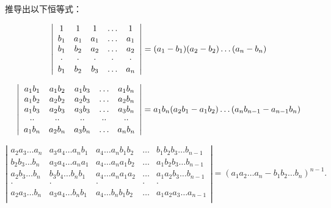推导出以下恒等式：

\[
\left| \begin{array}{c c c c c} 1 & 1 & 1 & \dots & 1 \\ b _ {1} & a _ {1} & a _ {1} & \dots & a _ {1} \\ b _ {1} & b _ {2} & a _ {2} & \dots & a _ {2} \\ \cdot & \cdot & \cdot & \cdot & \cdot \\ b _ {1} & b _ {2} & b _ {3} & \dots & a _ {n} \end{array} \right| = (a _ {1} - b _ {1}) (a _ {2} - b _ {2}) \dots (a _ {n} - b _ {n})
\]

\[
\left| \begin{array}{c c c c c} a _ {1} b _ {1} & a _ {1} b _ {2} & a _ {1} b _ {3} & \ldots & a _ {1} b _ {n} \\ a _ {1} b _ {2} & a _ {2} b _ {2} & a _ {2} b _ {3} & \ldots & a _ {2} b _ {n} \\ a _ {1} b _ {3} & a _ {2} b _ {3} & a _ {3} b _ {3} & \ldots & a _ {3} b _ {n} \\ \cdot \cdot & \cdot \cdot & \cdot \cdot & \cdot \cdot & \cdot \cdot \\ a _ {1} b _ {n} & a _ {2} b _ {n} & a _ {3} b _ {n} & \ldots & a _ {n} b _ {n} \end{array} \right| = a _ {1} b _ {n} (a _ {2} b _ {1} - a _ {1} b _ {2}) \ldots (a _ {n} b _ {n - 1} - a _ {n - 1} b _ {n})
\]

\[
\left| \begin{array}{cccccc} a _ {2} a _ {3} \ldots a _ {n} & a _ {3} a _ {4} \ldots a _ {n} b _ {1} & a _ {4} \ldots a _ {n} b _ {1} b _ {2} & \ldots & b _ {1} b _ {2} b _ {3} \ldots b _ {n - 1} \\ b _ {2} b _ {3} \ldots b _ {n} & a _ {3} a _ {4} \ldots a _ {n} a _ {1} & a _ {4} \ldots a _ {n} a _ {1} b _ {2} & \ldots & a _ {1} b _ {2} b _ {3} \ldots b _ {n - 1} \\ a _ {2} b _ {3} \ldots b _ {n} & b _ {3} b _ {4} \ldots b _ {n} b _ {1} & a _ {4} \ldots a _ {n} a _ {1} a _ {2} & \ldots & a _ {1} a _ {2} b _ {3} \ldots b _ {n - 1} \\ \cdot & \cdot & \cdot & \cdot & \cdot \\ a _ {2} a _ {3} \ldots b _ {n} & a _ {3} a _ {4} \ldots b _ {n} b _ {1} & a _ {4} \ldots b _ {n} b _ {1} b _ {2} & \ldots & a _ {1} a _ {2} a _ {3} \ldots a _ {n - 1} \\ \end{array} \right| = (a _ {1} a _ {2} \ldots a _ {n} - b _ {1} b _ {2} \ldots b _ {n}) ^ {n - 1}.
\]


